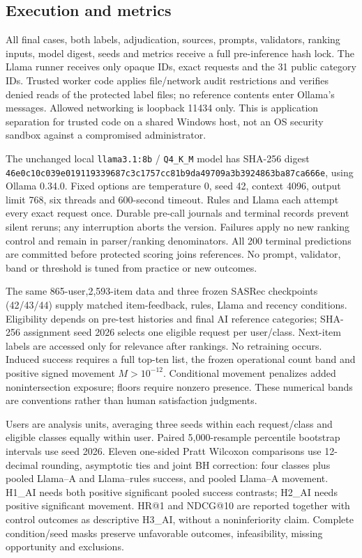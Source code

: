 \documentclass[conference]{IEEEtran}
\begin{document}
\subsection{Execution and metrics}
All final cases, both labels, adjudication, sources, prompts, validators, ranking inputs, model digest, seeds and metrics receive a full pre-inference hash lock. The Llama runner receives only opaque IDs, exact requests and the 31 public category IDs. Trusted worker code applies file/network audit restrictions and verifies denied reads of the protected label files; no reference contents enter Ollama's messages. Allowed networking is loopback 11434 only. This is application separation for trusted code on a shared Windows host, not an OS security sandbox against a compromised administrator.

The unchanged local \texttt{llama3.1:8b} / \texttt{Q4\_K\_M} model has SHA-256 digest \texttt{46e0c10c039e0191}\allowbreak\texttt{19339687c3c1757c}\allowbreak\texttt{c81b9da49709a3b3}\allowbreak\texttt{924863ba87ca666e}, using Ollama 0.34.0. Fixed options are temperature 0, seed 42, context 4096, output limit 768, six threads and 600-second timeout. Rules and Llama each attempt every exact request once. Durable pre-call journals and terminal records prevent silent reruns; any interruption aborts the version. Failures apply no new ranking control and remain in parser/ranking denominators. All 200 terminal predictions are committed before protected scoring joins references. No prompt, validator, band or threshold is tuned from practice or new outcomes.

The same 865-user,2,593-item data and three frozen SASRec checkpoints (42/43/44) supply matched item-feedback, rules, Llama and recency conditions. Eligibility depends on pre-test histories and final AI reference categories; SHA-256 assignment seed 2026 selects one eligible request per user/class. Next-item labels are accessed only for relevance after rankings. No retraining occurs. Induced success requires a full top-ten list, the frozen operational count band and positive signed movement $M>10^{-12}$. Conditional movement penalizes added nonintersection exposure; floors require nonzero presence. These numerical bands are conventions rather than human satisfaction judgments.

Users are analysis units, averaging three seeds within each request/class and eligible classes equally within user. Paired 5,000-resample percentile bootstrap intervals use seed 2026. Eleven one-sided Pratt Wilcoxon comparisons use 12-decimal rounding, asymptotic ties and joint BH correction: four classes plus pooled Llama--A and Llama--rules success, and pooled Llama--A movement. H1\_AI needs both positive significant pooled success contrasts; H2\_AI needs positive significant movement. HR@1 and NDCG@10 are reported together with control outcomes as descriptive H3\_AI, without a noninferiority claim. Complete condition/seed masks preserve unfavorable outcomes, infeasibility, missing opportunity and exclusions.
\end{document}

